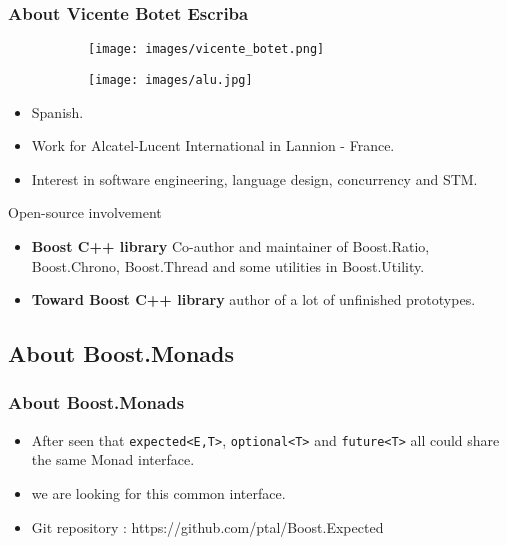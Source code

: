 \documentclass[xcolor=dvipsnames]{beamer}
\newcommand{\cpp}[1]{\lstinline{#1}}
\begin{document}
\begin{frame}
\frametitle{About Vicente Botet Escriba}

\begin{figure}[p]
  \centering
  \begin{subfigure}[b]{0.3\textwidth}
    \texttt{[image: images/vicente\_botet.png]}
  \end{subfigure}
  \qquad \qquad \quad
  \begin{subfigure}[b]{0.3\textwidth}
    \texttt{[image: images/alu.jpg]}
  \end{subfigure}
\end{figure}

\begin{itemize}
\item Spanish.
\item Work for Alcatel-Lucent International in Lannion - France.
\item Interest in software engineering, language design, concurrency and STM.
\end{itemize}

\begin{block}{Open-source involvement}
\begin{itemize}
\item \textbf{Boost C++ library} Co-author and maintainer of Boost.Ratio, Boost.Chrono, Boost.Thread and some utilities in Boost.Utility.
\item \textbf{Toward Boost C++ library} author of a lot of unfinished prototypes.
\end{itemize}
\end{block}
\end{frame}

\subsection{About Boost.Monads}
\begin{frame}
\frametitle{About Boost.Monads}

\begin{itemize}
\item After seen that \cpp{expected<E,T>}, \cpp{optional<T>} and \cpp{future<T>} all could share the same Monad interface.
\item we are looking for this common interface.
\end{itemize}

\begin{itemize}
\item Git repository : https://github.com/ptal/Boost.Expected
\end{itemize}
\end{frame}
\end{document}
